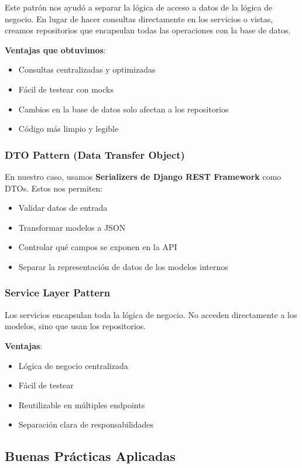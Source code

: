 Este patrón nos ayudó a separar la lógica de acceso a datos de la lógica de negocio. En lugar de hacer consultas directamente en los servicios o vistas, creamos repositorios que encapsulan todas las operaciones con la base de datos.

\textbf{Ventajas que obtuvimos}:
\begin{itemize}
    \item Consultas centralizadas y optimizadas
    \item Fácil de testear con mocks
    \item Cambios en la base de datos solo afectan a los repositorios
    \item Código más limpio y legible
\end{itemize}

\subsubsection{DTO Pattern (Data Transfer Object)}

En nuestro caso, usamos \textbf{Serializers de Django REST Framework} como DTOs. Estos nos permiten:
\begin{itemize}
    \item Validar datos de entrada
    \item Transformar modelos a JSON
    \item Controlar qué campos se exponen en la API
    \item Separar la representación de datos de los modelos internos
\end{itemize}

\subsubsection{Service Layer Pattern}

Los servicios encapsulan toda la lógica de negocio. No acceden directamente a los modelos, sino que usan los repositorios.

\textbf{Ventajas}:
\begin{itemize}
    \item Lógica de negocio centralizada
    \item Fácil de testear
    \item Reutilizable en múltiples endpoints
    \item Separación clara de responsabilidades
\end{itemize}

\subsection{Buenas Prácticas Aplicadas}

